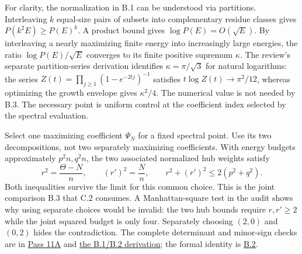 \documentclass[11pt,letterpaper]{article}
\theoremstyle{definition}\newtheorem{definition}[theorem]{Definition}\newtheorem{example}[theorem]{Example}
\theoremstyle{remark}\newtheorem{remark}[theorem]{Remark}
\newcommand{\pub}[3]{\href{https://github.com/anthropics/formal-math/blob/11b6c7e3c927df2658f513b6b68ea7f8929c62c5/vp-vnp/#1\#L#2}{#3}}
\newcommand{\aud}[2]{\href{https://github.com/nousentllc/VP-VNP-Review/blob/567303d0bcf4f9d54390437b137752446e58ccd6/#1}{#2}}
\begin{document}
For clarity, the normalization in B.1 can be understood via partitions. Interleaving $k$ equal-size pairs of subsets into complementary residue classes gives $P(k^2E)\ge P(E)^k$. A product bound gives $\log P(E)=O(\sqrt E)$. By interleaving a nearly maximizing finite energy into increasingly large energies, the ratio $\log P(E)/\sqrt E$ converges to its finite positive supremum $\kappa$. The review's separate partition-series derivation identifies $\kappa=\pi/\sqrt3$ for natural logarithms: the series $Z(t)=\prod_{j\ge1}(1-e^{-2tj})^{-1}$ satisfies $t\log Z(t)\to\pi^2/12$, whereas optimizing the growth envelope gives $\kappa^2/4$. The numerical value is not needed by B.3. The necessary point is uniform control at the coefficient index selected by the spectral evaluation.

Select one maximizing coefficient $\Psi_N$ for a fixed spectral point. Use its two decompositions, not two separately maximizing coefficients. With energy budgets approximately $p^2 n,q^2 n$, the two associated normalized hub weights satisfy
\[
 r^2=\frac{\Theta-N}{n},\qquad (r')^2=\frac{N}{n},\qquad
 r^2+(r')^2\le2(p^2+q^2).
\]
Both inequalities survive the limit for this common choice. This is the joint comparison B.3 that C.2 consumes. A Manhattan-square test in the audit shows why using separate choices would be invalid: the two hub bounds require $r,r'\ge2$ while the joint squared budget is only four. Separately choosing $(2,0)$ and $(0,2)$ hides the contradiction. The complete determinant and minor-sign checks are in \aud{passes/11a-crossing.md}{Pass 11A} and \aud{report/VP_VNP_Research_Review.pdf}{the B.1/B.2 derivation}; the formal identity is \pub{Paper/Identity.lean}{699}{B.2}.
\end{document}
